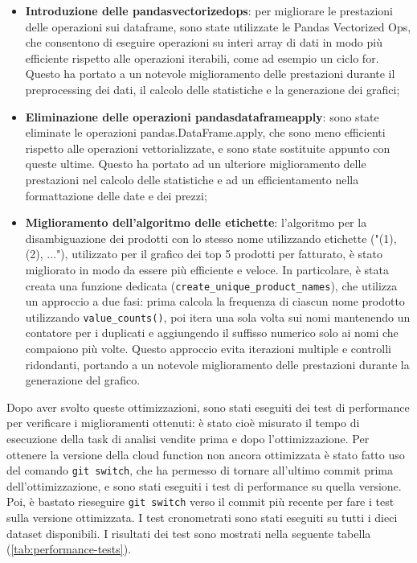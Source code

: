 \begin{itemize}
    \item \textbf{Introduzione delle \gls{pandasvectorizedops}}: per migliorare le prestazioni delle operazioni sui dataframe, sono state utilizzate le Pandas Vectorized Ops, che consentono di eseguire operazioni su interi array di dati in modo più efficiente rispetto alle operazioni iterabili, come ad esempio un ciclo for. Questo ha portato a un notevole miglioramento delle prestazioni durante il preprocessing dei dati, il calcolo delle statistiche e la generazione dei grafici;
    \item \textbf{Eliminazione delle operazioni pandasdataframeapply}: sono state eliminate le operazioni pandas.DataFrame.apply, che sono meno efficienti rispetto alle operazioni vettorializzate, e sono state sostituite appunto con queste ultime. Questo ha portato ad un ulteriore miglioramento delle prestazioni nel calcolo delle statistiche e ad un efficientamento nella formattazione delle date e dei prezzi;
    \item \textbf{Miglioramento dell'algoritmo delle etichette}: l'algoritmo per la disambiguazione dei prodotti con lo stesso nome utilizzando etichette ("(1), (2), ..."), utilizzato per il grafico dei top 5 prodotti per fatturato, è stato migliorato in modo da essere più efficiente e veloce. In particolare, è stata creata una funzione dedicata (\texttt{create\_unique\_product\_names}), che utilizza un approccio a due fasi: prima calcola la frequenza di ciascun nome prodotto utilizzando \texttt{value\_counts()}, poi itera una sola volta sui nomi mantenendo un contatore per i duplicati e aggiungendo il suffisso numerico solo ai nomi che compaiono più volte. Questo approccio evita iterazioni multiple e controlli ridondanti, portando a un notevole miglioramento delle prestazioni durante la generazione del grafico.
\end{itemize}

Dopo aver svolto queste ottimizzazioni, sono stati eseguiti dei test di performance per verificare i miglioramenti ottenuti: è stato cioè misurato il tempo di esecuzione della task di analisi vendite prima e dopo l'ottimizzazione. Per ottenere la versione della cloud function non ancora ottimizzata è stato fatto uso del comando \texttt{git switch}, che ha permesso di tornare all'ultimo commit prima dell'ottimizzazione, e sono stati eseguiti i test di performance su quella versione. Poi, è bastato rieseguire \texttt{git switch} verso il commit più recente per fare i test sulla versione ottimizzata. I test cronometrati sono stati eseguiti su tutti i dieci dataset disponibili.
I risultati dei test sono mostrati nella seguente tabella (\ref{tab:performance-tests}).

